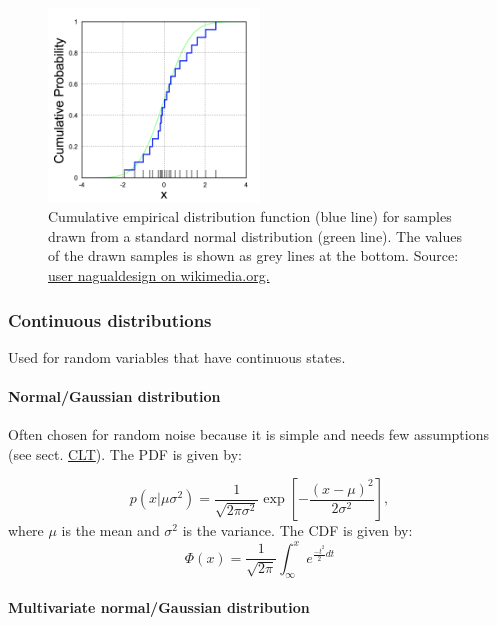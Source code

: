 \documentclass[
]{book}
\begin{document}
\begin{figure}
\centering
\includegraphics[width=0.5\textwidth,height=\textheight]{./figures/Empirical_distribution_function.png}
\caption{Cumulative empirical distribution function (blue line) for samples
drawn from a standard normal distribution (green line). The values of
the drawn samples is shown as grey lines at the bottom. Source: \href{https://commons.wikimedia.org/wiki/File:Empirical_distribution_function.png}{user
nagualdesign on
wikimedia.org.}}
\end{figure}

\hypertarget{continuous-distributions}{%
\subsubsection{Continuous distributions}\label{continuous-distributions}}

Used for random variables that have continuous states.

\hypertarget{normalgaussian-distribution}{%
\paragraph{Normal/Gaussian distribution}\label{normalgaussian-distribution}}

Often chosen for random noise because it is simple and needs few
assumptions (see sect. \protect\hyperlink{CLT}{CLT}). The PDF is given by:

\[p(x|\mu\sigma^2)= \frac{1}{\sqrt{2\pi\sigma^2}}\exp\left[-\frac{(x-\mu)^2}{2\sigma^2}\right],\]
where \(\mu\) is the mean and \(\sigma^2\) is the variance. The CDF is given
by:
\[\Phi(x) = \frac{1}{\sqrt{2\pi}}\int_{\infty}^xe^{\frac{-t^2}{2}dt}\]

\hypertarget{multivariate-normalgaussian-distribution}{%
\paragraph{Multivariate normal/Gaussian distribution}\label{multivariate-normalgaussian-distribution}}
\end{document}
